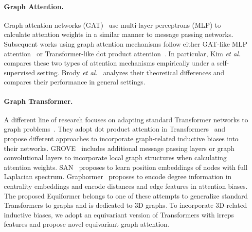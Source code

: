 \paragraph{Graph Attention.}
Graph attention networks (GAT)~\citep{gat, gatv2} use multi-layer perceptrons (MLP) to calculate attention weights in a similar manner to message passing networks.
Subsequent works using graph attention mechanisms follow either GAT-like MLP attention~\citep{relational_graph_attention_networks, graph_attention_with_self_supervision} or Transformer-like dot product attention~\citep{gaan, hard_graph_attention, masked_label_prediction, generalization_transformer_graphs, graph_attention_with_self_supervision, spectral_attention}.
In particular, Kim \textit{et al.}~\citep{graph_attention_with_self_supervision} compares these two types of attention mechanisms empirically under a self-supervised setting.
Brody \textit{et al.}~\citep{gatv2} analyzes their theoretical differences and compares their performance in general settings.

\paragraph{Graph Transformer.}
A different line of research focuses on adapting standard Transformer networks to graph problems~\citep{generalization_transformer_graphs, grove, spectral_attention, graphormer, graphormer_3d}.
They adopt dot product attention in Transformers~\citep{transformer} and propose different approaches to incorporate graph-related inductive biases into their networks.
GROVE~\citep{grove} includes additional message passing layers or graph convolutional layers to incorporate local graph structures when calculating attention weights.
SAN~\citep{spectral_attention} proposes to learn position embeddings of nodes with full Laplacian spectrum.
Graphormer~\citep{graphormer} proposes to encode degree information in centrality embeddings and encode distances and edge features in attention biases.
The proposed Equiformer belongs to one of these attempts to generalize standard Transformers to graphs and is dedicated to 3D graphs.
To incorporate 3D-related inductive biases, we adopt an equivariant version of Transformers with irreps features and propose novel equivariant graph attention.


